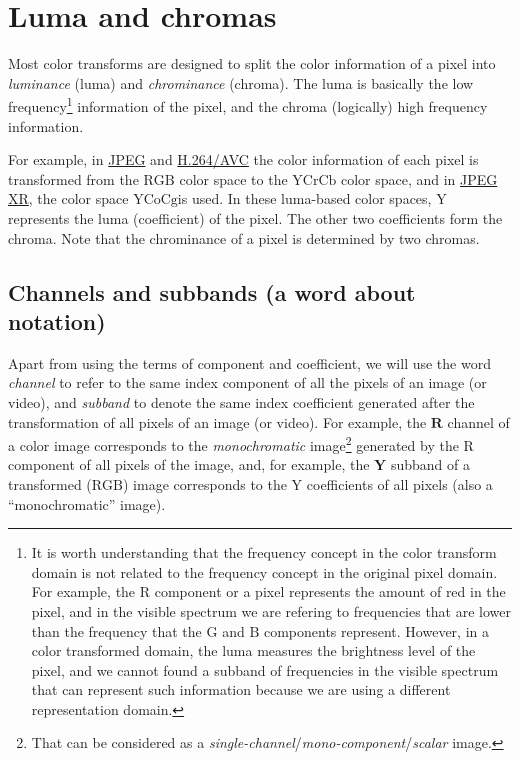 \section{Luma and chromas}

Most color transforms are designed to split the color information of a
pixel into \emph{luminance} (luma) and \emph{chrominance}
(chroma). The luma is basically the low frequency\footnote{It is worth
  understanding that the frequency concept in the color transform
  domain is not related to the frequency concept in the original pixel
  domain. For example, the $\text{R}$ component or a pixel represents
  the amount of red in the pixel, and in the visible spectrum we are
  refering to frequencies that are lower than the frequency that the
  $\text{G}$ and $\text{B}$ components represent. However, in a color
  transformed domain, the luma measures the brightness level of the
  pixel, and we cannot found a subband of frequencies in the visible
  spectrum that can represent such information because we are using a
  different representation domain.} information of the pixel, and the
chroma (logically) high frequency information.

For example, in
\href{https://en.wikipedia.org/wiki/JPEG#JPEG_codec_example}{JPEG} and
\href{https://en.wikipedia.org/wiki/Advanced_Video_Coding#Fidelity_range_extensions_and_professional_profiles}{H.264/AVC}
the color information of each pixel is transformed from the
$\text{RGB}$ color space to the $\text{YCrCb}$ color space, and in
\href{https://en.wikipedia.org/wiki/JPEG_XR#Description}{JPEG XR}, the
color space $\text{YCoCg}$is used. In these luma-based color spaces,
$\text{Y}$ represents the luma (coefficient) of the pixel. The other
two coefficients form the chroma. Note that the chrominance of a pixel
is determined by two chromas.

\subsection*{Channels and subbands (a word about notation)}

Apart from using the terms of component and coefficient, we will use
the word \emph{channel} to refer to the same index component of all
the pixels of an image (or video), and \emph{subband} to denote the
same index coefficient generated after the transformation of all
pixels of an image (or video). For example, the $\mathbf{R}$ channel
of a color image corresponds to the \emph{monochromatic}
image\footnote{That can be considered as a
  \emph{single-channel}/\emph{mono-component}/\emph{scalar} image.}
generated by the $\text{R}$ component of all pixels of the image, and,
for example, the $\mathbf{Y}$ subband of a transformed ($\text{RGB}$)
image corresponds to the $\text{Y}$ coefficients of all pixels (also a
``monochromatic'' image).

